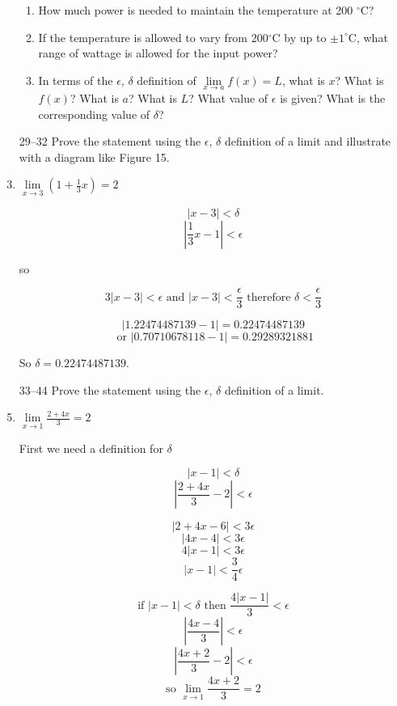 \documentclass{article}
\begin{document}
\begin{enumerate}
\begin{enumerate}
			\item How much power is needed to maintain the temperature at 200 $^{\circ}$C?
			
			\item If the temperature is allowed to vary from 200$^{\circ}$C by up to $\pm 1^{\circ}\text{C}$,
				what range of wattage is allowed for the input power?
				
			\item In terms of the $\epsilon$, $\delta$ definition of $\lim \limits _{x \to a} f(x) = L$, what is $x$?
				What is $f(x)$? What is $a$? What is $L$? What value of $\epsilon$ is given? What is the 
				corresponding value of $\delta$?
		\end{enumerate}
				
		\item[29--32] Prove the statement using the $\epsilon$, $\delta$ definition of a limit and illustrate with a diagram
				like Figure 15.
				
		\item $\lim \limits _{x \to 3} (1 + \frac{1}{3}x) = 2$ 
		
			$$| x - 3| < \delta$$
			$$|\frac{1}{3}x - 1 | < \epsilon$$
			
			so
			
			$$3|x - 3| < \epsilon \text{ and } |x - 3| < \frac{\epsilon}{3} \text{ therefore } \delta < \frac{\epsilon}{3}$$

				$$| 1.22474487139 - 1| = 0.22474487139 $$ 
				$$\text{ or } |0.70710678118 - 1 | = 0.29289321881$$
				
				So $\delta = 0.22474487139$.
				
				
			
		\item[33--44] Prove the statement using the $\epsilon$, $\delta$ definition of a limit.
		
		\item $\lim \limits _{x \to 1} \frac{2 + 4x}{3} = 2$
		
			First we need a definition for $\delta$
			
			$$|x - 1| < \delta$$
			$$|\frac{2 + 4x}{3} -2| < \epsilon$$
			
			$$|2 + 4x - 6| < 3\epsilon$$
			$$|4x - 4| < 3\epsilon$$
			$$4|x - 1| < 3\epsilon$$
			$$|x - 1| < \frac{3}{4}\epsilon$$
			
			$$\text{if } |x - 1| < \delta \text{ then } \frac{4 |x - 1|}{3} < \epsilon$$
			$$|\frac{4x - 4}{3} | < \epsilon$$
			$$|\frac{4x + 2}{3} - 2| < \epsilon$$
			$$\text{so } \lim \limits _{x \to 1} \frac{4x + 2}{3} = 2$$
				

\end{enumerate}
\end{document}
